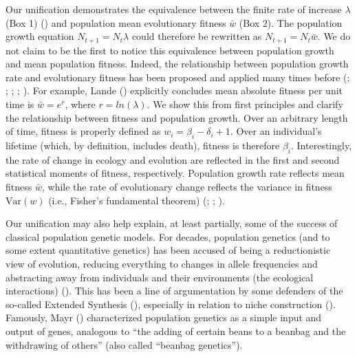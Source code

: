 \documentclass[
]{article}
\begin{document}
Our unification demonstrates the equivalence between the finite rate of
increase \(\lambda\) (Box 1) ()
and population mean evolutionary fitness \(\bar{w}\) (Box 2). The
population growth equation \(N_{t+1} = N_{t}\lambda\) could therefore be
rewritten as \(N_{t+1} = N_{t}\bar{w}\). We do not claim to be the first
to notice this equivalence between population growth and mean population
fitness. Indeed, the relationship between population growth rate and
evolutionary fitness has been proposed and applied many times before
(;
;
; ; ). For example, Lande
() explicitly concludes mean absolute
fitness per unit time is \(\bar{w} = e^{r}\), where \(r = ln(\lambda)\).
We show this from first principles and clarify the relationship between
fitness and population growth. Over an arbitrary length of time, fitness
is properly defined as \(w_{i} = \beta_{i} - \delta_{i} + 1\). Over an
individual's lifetime (which, by definition, includes death), fitness is
therefore \(\beta_{i}\). Interestingly, the rate of change in ecology
and evolution are reflected in the first and second statistical moments
of fitness, respectively. Population growth rate reflects mean fitness
\(\bar{w}\), while the rate of evolutionary change reflects the variance
in fitness \(\mathrm{Var}(w)\) (i.e., Fisher's fundamental theorem)
(; ; ).

Our unification may also help explain, at least partially, some of the
success of classical population genetic models. For decades, population
genetics (and to some extent quantitative genetics) has been accused of
being a reductionistic view of evolution, reducing everything to changes
in allele frequencies and abstracting away from individuals and their
environments (the ecological interactions)
(). This has been a line of
argumentation by some defenders of the so-called Extended Synthesis
(), especially in relation
to niche construction (). Famously, Mayr () characterized
population genetics as a simple input and output of genes, analogous to
``the adding of certain beans to a beanbag and the withdrawing of
others'' (also called ``beanbag genetics'').
\end{document}
